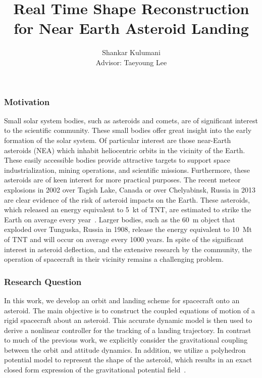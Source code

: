 \documentclass[11pt,reqno,twocolumn]{article} %
\title{Real Time Shape Reconstruction for Near Earth Asteroid Landing}
\author{Shankar Kulumani\\Advisor: Taeyoung Lee}
\date{} %
\begin{document}
\maketitle
\subsubsection*{Motivation}
Small solar system bodies, such as asteroids and comets, are of significant interest to the scientific community.
These small bodies offer great insight into the early formation of the solar system.
Of particular interest are those near-Earth asteroids (NEA) which inhabit heliocentric orbits in the vicinity of the Earth.
These easily accessible bodies provide attractive targets to support space industrialization, mining operations, and scientific missions.
Furthermore, these asteroids are of keen interest for more practical purposes.
The recent meteor explosions in  2002 over Tagish Lake, Canada or over Chelyabinsk, Russia in 2013 are clear evidence of the risk of asteroid impacts on the Earth.
These asteroids, which released an energy equivalent to \SI{5}{\kilo\tonne} of TNT, are estimated to strike the Earth on average every year~\cite{brown2002}.
Larger bodies, such as the \SI{60}{\meter} object that exploded over Tunguska, Russia in 1908, release the energy equivalent to \SI{10}{\mega\tonne} of TNT and will occur on average every \num{1000} years.
In spite of the significant interest in asteroid deflection, and the extensive research by the community, the operation of spacecraft in their vicinity remains a challenging problem.

\subsubsection*{Research Question}
In this work, we develop an orbit and landing scheme for spacecraft onto an asteroid.
The main objective is to construct the coupled equations of motion of a rigid spacecraft about an asteroid.
This accurate dynamic model is then used to derive a nonlinear controller for the tracking of a landing trajectory.
In contrast to much of the previous work, we explicitly consider the gravitational coupling between the orbit and attitude dynamics.
In addition, we utilize a polyhedron potential model to represent the shape of the asteroid, which results in an exact closed form expression of the gravitational potential field~\cite{werner1994,werner1996}.
\end{document}

